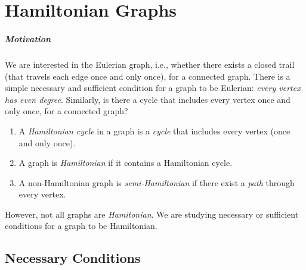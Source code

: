 \chapter{Hamiltonian Graphs}
\paragraph{Motivation}
We are interested in the Eulerian graph, i.e., 
whether there exists a closed trail (that travels each edge once and only once), for a connected graph.
There is a simple necessary and sufficient condition for a graph to be Eulerian: \emph{every vertex has even degree}.
Similarly, is there a cycle that includes every vertex once and only once, for a connected graph?

\begin{definition}[Hamiltionian]
\begin{enumerate}
\item
A \emph{Hamiltonian cycle} in a graph is a \emph{cycle} that includes every vertex (once and only once).
\item
A graph is \emph{Hamiltonian} if it contains a Hamiltonian cycle.
\item
A non-Hamiltonian graph is \emph{semi-Hamiltonian} if there exist a \emph{path} through every vertex.
\end{enumerate}
\end{definition}

However, not all graphs are \emph{Hamitonian}. We are studying necessary or sufficient conditions for a graph to be Hamiltonian.

\section{Necessary Conditions}

